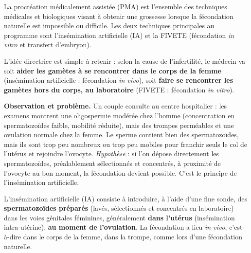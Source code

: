\documentclass[11pt]{article}
\newcommand{\cle}[1]{{\popxbold\color{popdark}#1}}
\newcounter{popsec}
\newcounter{popsub}
\newcommand{\courssub}[1]{%
  \stepcounter{popsub}%
  \par\vspace{9pt}\noindent{\popxbold\fontsize{11.5}{13}\selectfont\color{popink}{\color{poporange}\thepopsec.\thepopsub}\hspace{6pt}#1}\par\nopagebreak\vspace{4pt}
}
\begin{document}
\begin{definition}
La \cle{procréation médicalement assistée} (PMA) est l'ensemble des techniques médicales et biologiques visant à obtenir une grossesse lorsque la fécondation naturelle est impossible ou difficile. Les deux techniques principales au programme sont l'\cle{insémination artificielle} (IA) et la \cle{FIVETE} (fécondation \emph{in vitro} et transfert d'embryon).
\end{definition}

L'idée directrice est simple à retenir : selon la cause de l'infertilité, le médecin va soit \textbf{aider les gamètes à se rencontrer dans le corps de la femme} (insémination artificielle : fécondation \emph{in vivo}), soit \textbf{faire se rencontrer les gamètes hors du corps, au laboratoire} (FIVETE : fécondation \emph{in vitro}).

\courssub{L'insémination artificielle (IA)}

\textbf{Observation et problème.} Un couple consulte au centre hospitalier : les examens montrent une oligospermie modérée chez l'homme (concentration en spermatozoïdes faible, mobilité réduite), mais des trompes perméables et une ovulation normale chez la femme. Le sperme contient bien des spermatozoïdes, mais ils sont trop peu nombreux ou trop peu mobiles pour franchir seuls le col de l'utérus et rejoindre l'ovocyte. \emph{Hypothèse} : si l'on dépose directement les spermatozoïdes, préalablement sélectionnés et concentrés, à proximité de l'ovocyte au bon moment, la fécondation devient possible. C'est le principe de l'insémination artificielle.

\begin{definition}
L'\cle{insémination artificielle} (IA) consiste à introduire, à l'aide d'une fine sonde, des \textbf{spermatozoïdes préparés} (lavés, sélectionnés et concentrés en laboratoire) dans les voies génitales féminines, généralement \textbf{dans l'utérus} (insémination intra-utérine), \textbf{au moment de l'ovulation}. La fécondation a lieu \emph{in vivo}, c'est-à-dire dans le corps de la femme, dans la trompe, comme lors d'une fécondation naturelle.
\end{definition}
\end{document}
